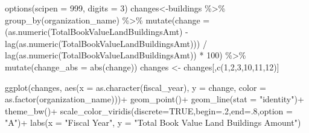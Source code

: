\documentclass[
]{article}
\newenvironment{Shaded}{\begin{snugshade}}{\end{snugshade}}
\newcommand{\AttributeTok}[1]{\textcolor[rgb]{0.77,0.63,0.00}{#1}}
\newcommand{\ConstantTok}[1]{\textcolor[rgb]{0.00,0.00,0.00}{#1}}
\newcommand{\DecValTok}[1]{\textcolor[rgb]{0.00,0.00,0.81}{#1}}
\newcommand{\FunctionTok}[1]{\textcolor[rgb]{0.00,0.00,0.00}{#1}}
\newcommand{\NormalTok}[1]{#1}
\newcommand{\OtherTok}[1]{\textcolor[rgb]{0.56,0.35,0.01}{#1}}
\newcommand{\SpecialCharTok}[1]{\textcolor[rgb]{0.00,0.00,0.00}{#1}}
\newcommand{\StringTok}[1]{\textcolor[rgb]{0.31,0.60,0.02}{#1}}
\begin{document}
\begin{Shaded}
\begin{Highlighting}[]
\FunctionTok{options}\NormalTok{(}\AttributeTok{scipen =} \DecValTok{999}\NormalTok{, }\AttributeTok{digits =} \DecValTok{3}\NormalTok{)}
\NormalTok{changes}\OtherTok{\textless{}{-}}\NormalTok{buildings }\SpecialCharTok{\%\textgreater{}\%} 
  \FunctionTok{group\_by}\NormalTok{(organization\_name) }\SpecialCharTok{\%\textgreater{}\%} 
  \FunctionTok{mutate}\NormalTok{(}\AttributeTok{change =}\NormalTok{ (}\FunctionTok{as.numeric}\NormalTok{(TotalBookValueLandBuildingsAmt) }\SpecialCharTok{{-}} \FunctionTok{lag}\NormalTok{(}\FunctionTok{as.numeric}\NormalTok{(TotalBookValueLandBuildingsAmt))) }\SpecialCharTok{/} \FunctionTok{lag}\NormalTok{(}\FunctionTok{as.numeric}\NormalTok{(TotalBookValueLandBuildingsAmt)) }\SpecialCharTok{*} \DecValTok{100}\NormalTok{) }\SpecialCharTok{\%\textgreater{}\%}
  \FunctionTok{mutate}\NormalTok{(}\AttributeTok{change\_abs =} \FunctionTok{abs}\NormalTok{(change))}
\NormalTok{changes }\OtherTok{\textless{}{-}}\NormalTok{ changes[,}\FunctionTok{c}\NormalTok{(}\DecValTok{1}\NormalTok{,}\DecValTok{2}\NormalTok{,}\DecValTok{3}\NormalTok{,}\DecValTok{10}\NormalTok{,}\DecValTok{11}\NormalTok{,}\DecValTok{12}\NormalTok{)]}
\end{Highlighting}
\end{Shaded}

\begin{Shaded}
\begin{Highlighting}[]
  \FunctionTok{ggplot}\NormalTok{(changes, }\FunctionTok{aes}\NormalTok{(}\AttributeTok{x =} \FunctionTok{as.character}\NormalTok{(fiscal\_year), }\AttributeTok{y =}\NormalTok{ change, }\AttributeTok{color =} \FunctionTok{as.factor}\NormalTok{(organization\_name)))}\SpecialCharTok{+}
    \FunctionTok{geom\_point}\NormalTok{()}\SpecialCharTok{+}
    \FunctionTok{geom\_line}\NormalTok{(}\AttributeTok{stat =} \StringTok{"identity"}\NormalTok{)}\SpecialCharTok{+}
    \FunctionTok{theme\_bw}\NormalTok{()}\SpecialCharTok{+}
    \FunctionTok{scale\_color\_viridis}\NormalTok{(}\AttributeTok{discrete=}\ConstantTok{TRUE}\NormalTok{,}\AttributeTok{begin=}\NormalTok{.}\DecValTok{2}\NormalTok{,}\AttributeTok{end=}\NormalTok{.}\DecValTok{8}\NormalTok{,}\AttributeTok{option =} \StringTok{"A"}\NormalTok{)}\SpecialCharTok{+}
    \FunctionTok{labs}\NormalTok{(}\AttributeTok{x =} \StringTok{"Fiscal Year"}\NormalTok{, }\AttributeTok{y =} \StringTok{"Total Book Value Land Buildings Amount"}\NormalTok{)}
\end{Highlighting}
\end{Shaded}
\end{document}
